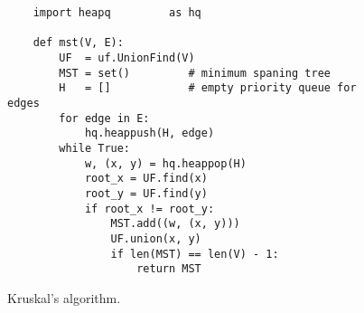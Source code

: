 \begin{figure}[!ht]
\centering
\begin{verbatim}
    import heapq         as hq

    def mst(V, E):
        UF  = uf.UnionFind(V)
        MST = set()         # minimum spaning tree
        H   = []            # empty priority queue for edges
        for edge in E:
            hq.heappush(H, edge)
        while True:
            w, (x, y) = hq.heappop(H)
            root_x = UF.find(x)
            root_y = UF.find(y)
            if root_x != root_y:
                MST.add((w, (x, y)))
                UF.union(x, y)
                if len(MST) == len(V) - 1:
                    return MST
\end{verbatim}
\vspace*{-0.3cm}
\caption{Kruskal's algorithm.}
\label{fig:Kruskal.ipynb}
\end{figure}

